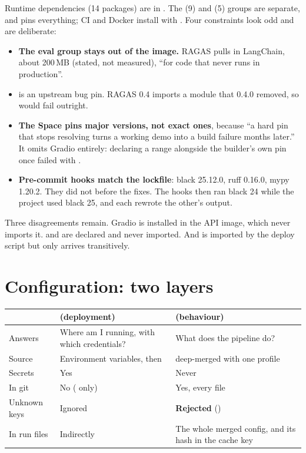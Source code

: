 Runtime dependencies (14 packages) are in . The  (9) and  (5) groups are separate, and  pins everything; CI and Docker install with . Four constraints look odd and are deliberate:
\begin{itemize}
  \item \textbf{The eval group stays out of the image.} RAGAS pulls in LangChain, about 200\,MB (stated, not measured), ``for code that never runs in production''.
  \item \textbf{} is an upstream bug pin. RAGAS 0.4 imports a module that 0.4.0 removed, so  would fail outright.
  \item \textbf{The Space pins major versions, not exact ones}, because ``a hard pin that stops resolving turns a working demo into a build failure months later.'' It omits Gradio entirely: declaring a range alongside the builder's own pin once failed with .
  \item \textbf{Pre-commit hooks match the lockfile}: black 25.12.0, ruff 0.16.0, mypy 1.20.2. They did not before the fixes. The hooks then ran black 24 while the project used black 25, and each rewrote the other's output.
\end{itemize}
Three disagreements remain. Gradio is installed in the API image, which never imports it.  and  are declared and never imported. And  is imported by the deploy script but only arrives transitively.

\section{Configuration: two layers}
\label{sec:config}

\begin{center}\small
\begin{tabularx}{\textwidth}{@{}>{\raggedright\arraybackslash}p{2.8cm}LL@{}}
\toprule
& \textbf{ (deployment)} & \textbf{ (behaviour)}\\
\midrule
Answers & Where am I running, with which credentials? & What does the pipeline do?\\
Source & Environment variables, then  &  deep-merged with one profile\\
Secrets & Yes & Never\\
In git & No ( only) & Yes, every file\\
Unknown keys & Ignored & \textbf{Rejected} ()\\
In run files & Indirectly & The whole merged config, and its hash in the cache key\\
\bottomrule
\end{tabularx}
\end{center}

